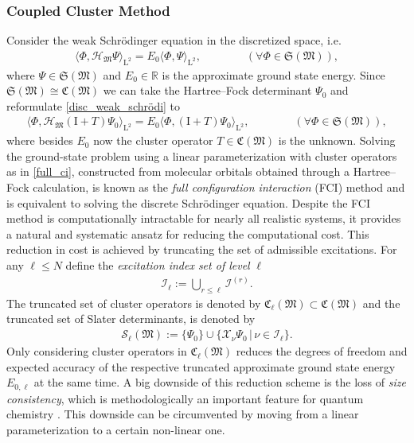 \documentclass[reqno]{amsart}
\begin{document}
\subsubsection{Coupled Cluster Method}
Consider the weak Schrödinger equation in the discretized space, i.e. 
\begin{align}\label{disc_weak_schrödi}
    \langle \Phi, \mathcal{H}_\mathfrak{M}\Psi\rangle_{\mathrm{L}^2}=E_0 \langle \Phi,\Psi\rangle_{\mathrm{L}^2},\qquad\qquad(\forall \Phi \in \mathfrak{S}(\mathfrak{M})),
\end{align}
where $\Psi \in \mathfrak{S}(\mathfrak{M})$ and $E_0\in \mathbb{R}$ is the approximate ground state energy. Since $\mathfrak{S}(\mathfrak{M})\cong \mathfrak{C}(\mathfrak{M})$ we can take the Hartree–Fock determinant $\Psi_0$ and reformulate \eqref{disc_weak_schrödi} to
\begin{align}\label{full_ci}
    \langle \Phi, \mathcal{H}_\mathfrak{M}(\mathrm{I}+T)\Psi_0\rangle_{\mathrm{L}^2}=E_0 \langle \Phi,(\mathrm{I}+T)\Psi_0\rangle_{\mathrm{L}^2},\qquad\qquad(\forall \Phi \in \mathfrak{S}(\mathfrak{M})),
\end{align}
where besides $E_0$ now the cluster operator $T\in \mathfrak{C}(\mathfrak{M})$ is the unknown. Solving the ground-state problem using a linear parameterization with cluster operators as in \eqref{full_ci}, constructed from molecular orbitals obtained through a Hartree–Fock calculation, is known as the \textit{full configuration interaction} (FCI) method and is equivalent to solving the discrete Schrödinger equation. Despite the FCI method is computationally intractable for nearly all realistic systems, it provides a natural and systematic ansatz for reducing the computational cost. This reduction in cost is achieved by truncating the set of admissible excitations. For any $\ell\le N$ define the \textit{excitation index set of level} $\ell$
\begin{align}\label{trun_ex_ind_set}
    \mathscr{I}_\ell:=\bigcup_{r\le \ell} \mathscr{I}^{(r)}.
\end{align} 
The truncated set of cluster operators is denoted by $\mathfrak{C}_\ell(\mathfrak{M})\subset \mathfrak{C}(\mathfrak{M})$ and the truncated set of Slater determinants, is denoted by
\begin{align}\label{trunc_slater_basis}
    \mathcal{S}_\ell(\mathfrak{M}):=\lbrace \Psi_0\rbrace \cup \lbrace \mathscr{X}_\nu \Psi_0\,|\, \nu \in \mathscr{I}_\ell\rbrace.
\end{align}
Only considering cluster operators in $\mathfrak{C}_\ell(\mathfrak{M})$ reduces the degrees of freedom and expected accuracy of the respective truncated approximate ground state energy $E_{0,\ell}$ at the same time. A big downside of this reduction scheme is the loss of \textit{size consistency}, which is methodologically an important feature for quantum chemistry \cite{helgakar}. This downside can be circumvented by moving from a linear parameterization to a certain non-linear one. 
\end{document}
